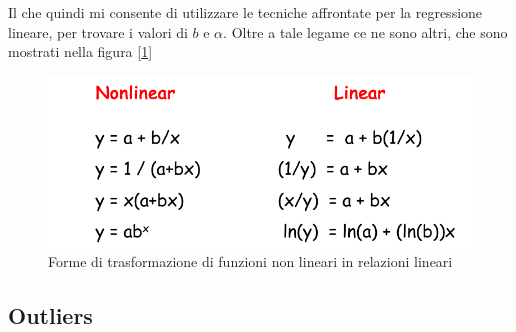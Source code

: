 Il che quindi mi consente di utilizzare le tecniche affrontate per la regressione lineare, per trovare i valori di \(b\) e \(\alpha\). Oltre a tale legame ce ne sono altri, che sono mostrati nella figura [\ref{img:trasformazioni-curvilinee}]

\begin{figure}[h]
\centering
\includegraphics[width=.7\textwidth]{img/chapter-5/relazioni-curvilinee.png}
\caption{Forme di trasformazione di funzioni non lineari in relazioni lineari}\label{img:trasformazioni-curvilinee}
\end{figure}

\subsection{Outliers}

